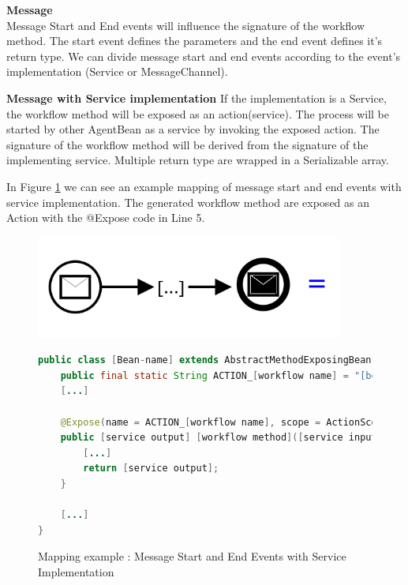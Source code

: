 \textbf{Message}\\
Message Start and End events will influence the signature of the workflow method. The start event defines the parameters and the end event defines it's return type. We can divide message start and end events according to the event's implementation (Service or MessageChannel). 

\textbf{Message with Service implementation}
If the implementation is a Service, the workflow method will be exposed as an action(service). The process will be started by other AgentBean as a service by invoking the exposed action. The signature of the workflow method will be derived from the signature of the implementing service. 
Multiple return type are wrapped in a Serializable array. 

In Figure \ref{fig:message_service} we can see an example mapping of message start and end events with service implementation. The generated workflow method are exposed as an Action with the @Expose code in Line 5. 
\begin{figure}[h]
\begin{minipage}[c]{0.35\textwidth}
\includegraphics[width=0.9\textwidth]{images/mapping/messageStart.png}
\end{minipage}
\begin{minipage}[c]{0.65\textwidth}
\begin{lstlisting}[language = Java]
public class [Bean-name] extends AbstractMethodExposingBean{
	public final static String ACTION_[workflow name] = "[bean fullname]#[workflow method]"; 
	[...]
	
	@Expose(name = ACTION_[workflow name], scope = ActionScope.GLOBAL)
	public [service output] [workflow method]([service inputs]){
		[...]
		return [service output];
	}
	
	[...]
}
\end{lstlisting}
\end{minipage}
\caption{Mapping example : Message Start and End Events with Service Implementation}%
\label{fig:message_service}
\end{figure}


